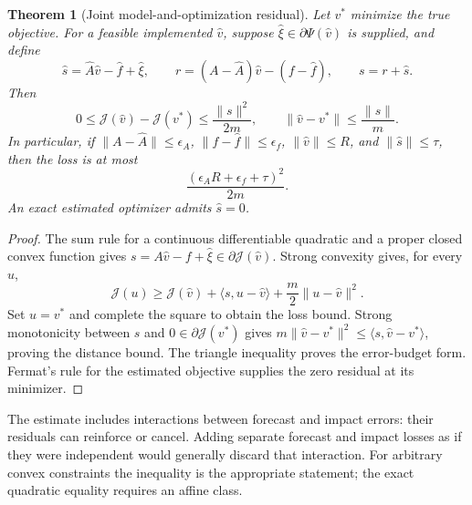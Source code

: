 \documentclass[11pt]{article}
\theoremstyle{plain}
\newtheorem{theorem}{Theorem}[section]
\theoremstyle{definition}
\theoremstyle{remark}
\newcommand{\norm}[1]{\lVert#1\rVert}
\newcommand{\ip}[2]{\langle#1,#2\rangle}
\begin{document}
\begin{theorem}[Joint model-and-optimization residual]\label{thm:jointresidual}
Let \(v^\ast\) minimize the true objective. For a feasible implemented
\(\widehat v\), suppose \(\widehat\xi\in\partial\Psi(\widehat v)\)
is supplied, and define
\[
\widehat s=\widehat A\widehat v-\widehat f+\widehat\xi,\qquad
r=(A-\widehat A)\widehat v-(f-\widehat f),\qquad s=r+\widehat s .
\]
Then
\begin{equation}\label{eq:jointresidual}
0\le\mathcal J(\widehat v)-\mathcal J(v^\ast)
\le\frac{\norm s^2}{2m},\qquad
\norm{\widehat v-v^\ast}\le\frac{\norm s}{m}.
\end{equation}
In particular, if
\(\norm{A-\widehat A}\le\epsilon_A\),
\(\norm{f-\widehat f}\le\epsilon_f\),
\(\norm{\widehat v}\le R\), and \(\norm{\widehat s}\le\tau\), then
the loss is at most
\[
\frac{(\epsilon_A R+\epsilon_f+\tau)^2}{2m}.
\]
An exact estimated optimizer admits \(\widehat s=0\).
\end{theorem}
\begin{proof}
The sum rule for a continuous differentiable quadratic and a proper
closed convex function gives
\(s=A\widehat v-f+\widehat\xi\in\partial\mathcal J(\widehat v)\).
Strong convexity gives, for every \(u\),
\[
\mathcal J(u)\ge\mathcal J(\widehat v)
 +\ip{s}{u-\widehat v}+\frac m2\norm{u-\widehat v}^2.
\]
Set \(u=v^\ast\) and complete the square to obtain the loss bound.
Strong monotonicity between \(s\) and
\(0\in\partial\mathcal J(v^\ast)\) gives
\(m\norm{\widehat v-v^\ast}^2
\le\ip{s}{\widehat v-v^\ast}\), proving the distance bound.
The triangle inequality proves the error-budget form. Fermat's rule
for the estimated objective supplies the zero residual at its minimizer.
\end{proof}

The estimate includes interactions between forecast and impact errors:
their residuals can reinforce or cancel. Adding separate forecast and
impact losses as if they were independent would generally discard that
interaction. For arbitrary convex constraints the inequality is the
appropriate statement; the exact quadratic equality requires an affine
class.
\end{document}
